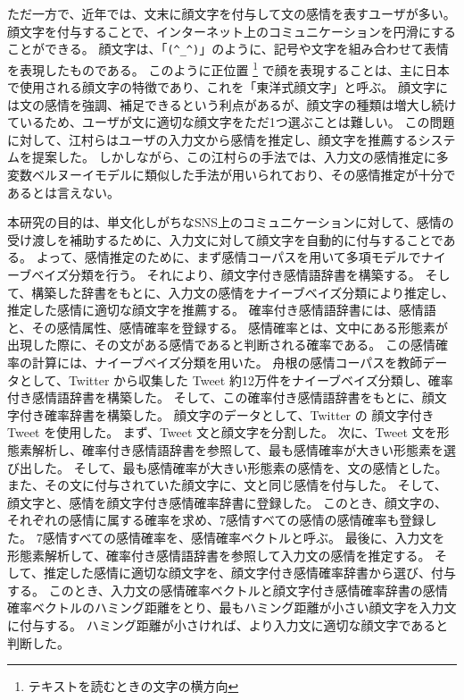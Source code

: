 \documentclass[11pt,a4j]{jsarticle}
\begin{document}
ただ一方で、近年では、文末に顔文字を付与して文の感情を表すユーザが多い。
顔文字を付与することで、インターネット上のコミュニケーションを円滑にすることができる。
顔文字は、「\verb|(^_^)|」のように、記号や文字を組み合わせて表情を表現したものである。
このように正位置 \footnote{テキストを読むときの文字の横方向} で顔を表現することは、主に日本で使用される顔文字の特徴であり、これを「東洋式顔文字」と呼ぶ。
顔文字には文の感情を強調、補足できるという利点があるが、顔文字の種類は増大し続けているため、ユーザが文に適切な顔文字をただ1つ選ぶことは難しい。
この問題に対して、江村らはユーザの入力文から感情を推定し、顔文字を推薦するシステムを提案した。
しかしながら、この江村らの手法では、入力文の感情推定に多変数ベルヌーイモデルに類似した手法が用いられており、その感情推定が十分であるとは言えない。

本研究の目的は、単文化しがちなSNS上のコミュニケーションに対して、感情の受け渡しを補助するために、入力文に対して顔文字を自動的に付与することである。
よって、感情推定のために、まず感情コーパスを用いて多項モデルでナイーブベイズ分類を行う。
それにより、顔文字付き感情語辞書を構築する。
そして、構築した辞書をもとに、入力文の感情をナイーブベイズ分類により推定し、推定した感情に適切な顔文字を推薦する。
確率付き感情語辞書には、感情語と、その感情属性、感情確率を登録する。
感情確率とは、文中にある形態素が出現した際に、その文がある感情であると判断される確率である。
この感情確率の計算には、ナイーブベイズ分類を用いた。
舟根の感情コーパスを教師データとして、Twitter から収集した Tweet 約12万件をナイーブベイズ分類し、確率付き感情語辞書を構築した。
そして、この確率付き感情語辞書をもとに、顔文字付き確率辞書を構築した。
顔文字のデータとして、Twitter の 顔文字付き Tweet を使用した。
まず、Tweet 文と顔文字を分割した。
次に、Tweet 文を形態素解析し、確率付き感情語辞書を参照して、最も感情確率が大きい形態素を選び出した。
そして、最も感情確率が大きい形態素の感情を、文の感情とした。
また、その文に付与されていた顔文字に、文と同じ感情を付与した。
そして、顔文字と、感情を顔文字付き感情確率辞書に登録した。
このとき、顔文字の、それぞれの感情に属する確率を求め、7感情すべての感情の感情確率も登録した。
7感情すべての感情確率を、感情確率ベクトルと呼ぶ。
最後に、入力文を形態素解析して、確率付き感情語辞書を参照して入力文の感情を推定する。
そして、推定した感情に適切な顔文字を、顔文字付き感情確率辞書から選び、付与する。
このとき、入力文の感情確率ベクトルと顔文字付き感情確率辞書の感情確率ベクトルのハミング距離をとり、最もハミング距離が小さい顔文字を入力文に付与する。
ハミング距離が小さければ、より入力文に適切な顔文字であると判断した。
\end{document}
